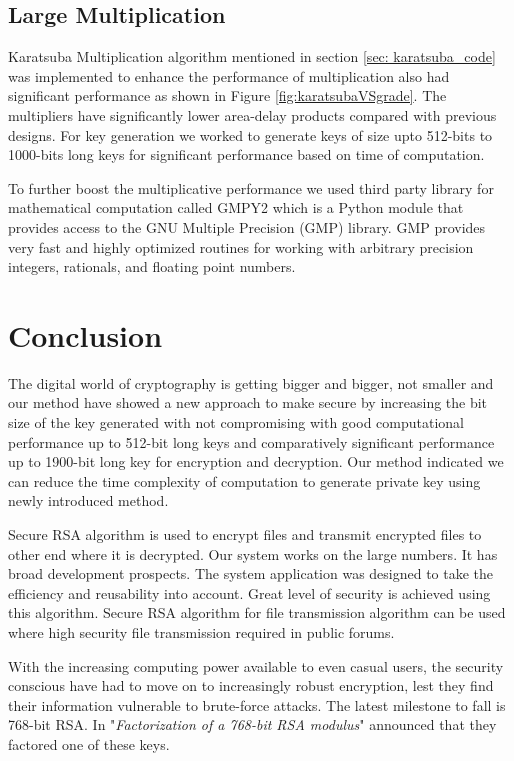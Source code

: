 \documentclass[12pt,journal,compsoc]{IEEEtran}
\begin{document}
\subsection{{Large Multiplication}}
Karatsuba Multiplication\cite{karatsuba_multiplication} algorithm mentioned in section \ref{sec: karatsuba_code} was implemented to enhance the performance of multiplication also had significant performance as shown in Figure \ref{fig:karatsubaVSgrade}. The multipliers have significantly lower area-delay products compared with previous designs\cite{karatsuba_multiplication}. For key generation we worked to generate keys of size upto 512-bits to 1000-bits long keys for significant performance based on time of computation.

To further boost the multiplicative performance we used third party library for mathematical computation called GMPY2\cite{gmpy2} which is a Python module that provides access to the GNU Multiple Precision (GMP) library. GMP provides very fast and highly optimized routines for working with arbitrary precision integers, rationals, and floating point numbers.


\section{{Conclusion}}



The digital world of cryptography is getting bigger and bigger, not smaller and our method have showed a new approach to make secure by increasing the bit size of the key generated with not compromising with good computational performance up to 512-bit long keys and comparatively significant performance up to 1900-bit long key for encryption and decryption.  Our method indicated we can reduce the time complexity of computation to generate private key using newly introduced method.


Secure RSA algorithm is used to encrypt files and transmit encrypted files to other end where it is decrypted. Our system works on the large numbers. It has broad development prospects. The system application was designed to take the efficiency and reusability into account. Great level of security is achieved using this algorithm. Secure RSA algorithm for file transmission algorithm can be used where high security file transmission required in public forums.


With the increasing computing power available to even casual users, the security conscious have had to move on to increasingly robust encryption, lest they find their information vulnerable to brute-force attacks. The latest milestone to fall is 768-bit RSA. In "\emph{Factorization of a 768-bit RSA modulus}"\cite{768_key} announced that they factored one of these keys. 
\end{document}
